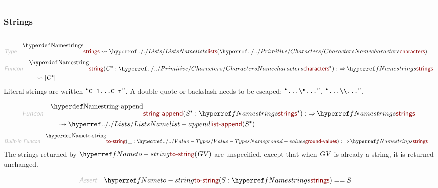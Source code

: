 

\begin{center}
\rule{3in}{0.4pt}
\end{center}

\subsubsection{Strings}\hypertarget{strings}{}\label{strings}

\begin{align*}
  [ \
  \KEY{Type} \quad & \NAMEREF{strings} \\
  \KEY{Funcon} \quad & \NAMEREF{string} \\
  \KEY{Funcon} \quad & \NAMEREF{string-append} \\
  \KEY{Funcon} \quad & \NAMEREF{to-string}
  \ ]
\end{align*}
\begin{align*}
  \KEY{Type} \quad 
  & \NAMEDECL{strings}  
    \leadsto \NAMEHYPER{../.}{Lists}{lists}
               (  \NAMEHYPER{../../Primitive}{Characters}{characters} )
\end{align*}
\begin{align*}
  \KEY{Funcon} \quad
  & \NAMEDECL{string}(
                       \VAR{C}\STAR : \NAMEHYPER{../../Primitive}{Characters}{characters}\STAR) 
    :  \TO \NAMEREF{strings} \\&\quad
    \leadsto [  \VAR{C}\STAR ]
\end{align*}
Literal strings are written $\SHADE{\STRING{C{\UNDERSCORE}1{.}{.}{.}C{\UNDERSCORE}n}}$.
  A double-quote or backslash needs to be escaped: $\SHADE{\STRING{{.}{.}{.}{\BACKSLASH}{"}{.}{.}{.}}}$, $\SHADE{\STRING{{.}{.}{.}{\BACKSLASH}{\BACKSLASH}{.}{.}{.}}}$.

\begin{align*}
  \KEY{Funcon} \quad
  & \NAMEDECL{string-append}(
                       \VAR{S}\STAR : \NAMEREF{strings}\STAR) 
    :  \TO \NAMEREF{strings} \\&\quad
    \leadsto \NAMEHYPER{../.}{Lists}{list-append}
               (  \VAR{S}\STAR )
\end{align*}
\begin{align*}
  \KEY{Built-in Funcon} \quad
  & \NAMEDECL{to-string}(
                       \_ : \NAMEHYPER{../..}{Value-Types}{ground-values}) 
    :  \TO \NAMEREF{strings} 
\end{align*}
The strings returned by $\SHADE{\NAMEREF{to-string}
           (  \VAR{GV} )}$ are unspecified, except that when
  $\SHADE{\VAR{GV}}$ is already a string, it is returned unchanged.

\begin{align*}
  \KEY{Assert} \quad
  & \NAMEREF{to-string}
      (  \VAR{S} : \NAMEREF{strings} ) 
    == \VAR{S}
\end{align*}


